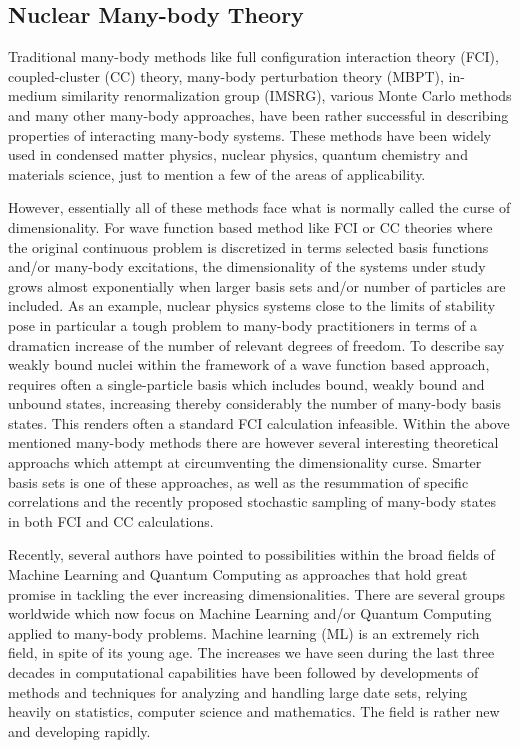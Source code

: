\documentclass[%
oneside,                 %
final,                   %
10pt]{article}
\begin{document}
\subsection{Nuclear Many-body Theory}

Traditional many-body methods like full configuration interaction
theory (FCI), coupled-cluster (CC) theory, many-body perturbation theory (MBPT),
in-medium similarity renormalization group (IMSRG),
various Monte Carlo methods and many other many-body
approaches, have been rather successful in describing properties of
interacting many-body systems. These methods have been widely used in
condensed matter physics, nuclear physics, quantum chemistry and
materials science, just to mention a few of the areas of
applicability.

However, essentially all of these methods face what is
normally called the curse of dimensionality. For wave function based
method like FCI or CC theories where the original continuous problem
is discretized in terms selected basis functions and/or many-body
excitations, the dimensionality of the systems under study grows almost
exponentially when larger basis sets and/or number of particles are
included. As an example, nuclear physics 
systems close to the limits of stability pose in
particular a tough problem to many-body practitioners in terms of a dramaticn
increase of the number of relevant degrees of freedom. To describe say
weakly bound nuclei within the framework of a wave function based
approach, requires often a single-particle basis which includes bound,
weakly bound and unbound states, increasing thereby considerably the
number of many-body basis states. This renders often a standard
FCI calculation infeasible. Within the above mentioned
many-body methods there are however several interesting theoretical
approachs which attempt at circumventing the dimensionality
curse. Smarter basis sets is one of these approaches, as well as the
resummation of specific correlations and the recently proposed
stochastic sampling of many-body states in both FCI and CC
calculations.

Recently, several authors have pointed to  possibilities within the
broad fields of Machine Learning and Quantum Computing as approaches
that hold great promise in tackling the ever increasing
dimensionalities. There are several groups worldwide which now focus
on Machine Learning and/or Quantum Computing applied to many-body
problems.
Machine learning (ML) is an extremely rich field, in spite of its
young age. The increases we have seen during the last three decades in
computational capabilities have been followed by developments of
methods and techniques for analyzing and handling large date sets,
relying heavily on statistics, computer science and mathematics.  The
field is rather new and developing rapidly.
\end{document}
